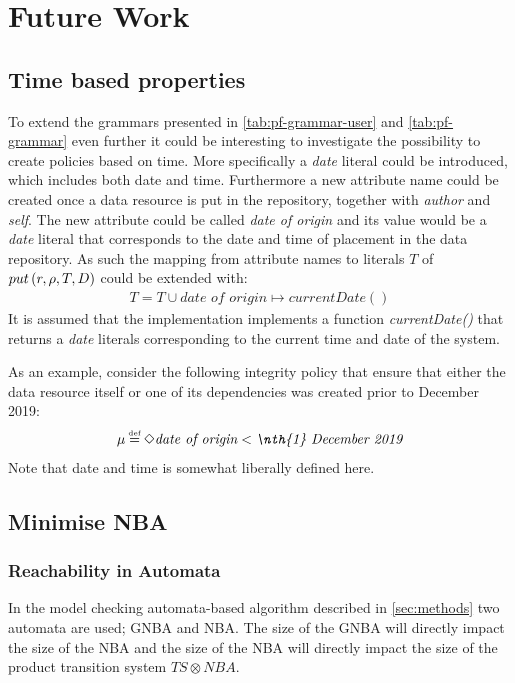 \section{Future Work}\label{sec:future-work}
\subsection{Time based properties}
To extend the grammars presented in \autoref{tab:pf-grammar-user} and \autoref{tab:pf-grammar} even further it could be interesting to investigate the possibility to create policies based on time. More specifically a \emph{date} literal could be introduced, which includes both date and time. Furthermore a new attribute name could be created once a data resource is put in the repository, together with \emph{author} and \emph{self}. The new attribute could be called \emph{date of origin} and its value would be a \emph{date} literal that corresponds to the date and time of placement in the data repository. As such the mapping from attribute names to literals $T$ of $put \left( r, \rho, T, D \right)$ could be extended with:
\begin{align*}
    T = T \cup \textit{date of origin} \mapsto currentDate()
\end{align*}
It is assumed that the implementation implements a function \emph{currentDate()} that returns a \emph{date} literals corresponding to the current time and date of the system.

As an example, consider the following integrity policy that ensure that either the data resource itself or one of its dependencies was created prior to  December 2019:
\begin{align*}
    \inte \eqdef \F \textit{date of origin} < \textit{\nth{1} December 2019}
\end{align*}
Note that date and time is somewhat liberally defined here.

\subsection{Minimise NBA}
\subsubsection{Reachability in Automata}\label{sec:reach}
In the model checking automata-based algorithm described in \autoref{sec:methods} two automata are used; GNBA and NBA. The size of the GNBA will directly impact the size of the NBA and the size of the NBA will directly impact the size of the product transition system $TS \otimes NBA$. 

